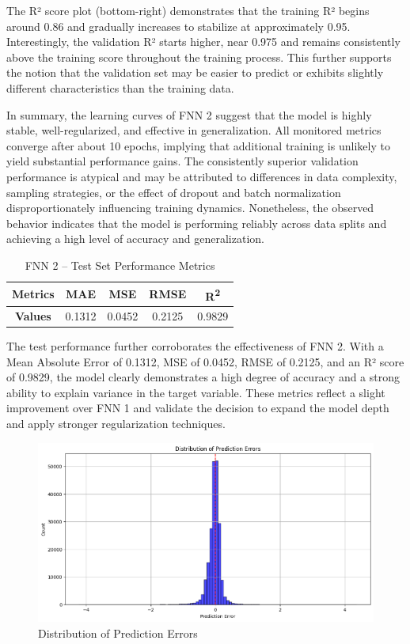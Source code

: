 The R² score plot (bottom-right) demonstrates that the training R² begins around 0.86 and gradually increases to stabilize at approximately 0.95. Interestingly, the validation R² starts higher, near 0.975 and remains consistently above the training score throughout the training process. This further supports the notion that the validation set may be easier to predict or exhibits slightly different characteristics than the training data.

In summary, the learning curves of FNN 2 suggest that the model is highly stable, well-regularized, and effective in generalization. All monitored metrics converge after about 10 epochs, implying that additional training is unlikely to yield substantial performance gains. The consistently superior validation performance is atypical and may be attributed to differences in data complexity, sampling strategies, or the effect of dropout and batch normalization disproportionately influencing training dynamics. Nonetheless, the observed behavior indicates that the model is performing reliably across data splits and achieving a high level of accuracy and generalization.

\begin{table}[h!]
\centering
\caption{FNN 2 – Test Set Performance Metrics}
\begin{tabular}{||c|c|c|c|c||}
\hline
\textbf{Metrics} & MAE & MSE & RMSE & R\textsuperscript{2} \\
\hline \hline
\textbf{Values} & 0.1312 & 0.0452 & 0.2125 & 0.9829 \\
\hline
\end{tabular}
\label{tab:fnn2_test_metrics}
\end{table}

The test performance further corroborates the effectiveness of FNN 2. With a Mean Absolute Error of 0.1312, MSE of 0.0452, RMSE of 0.2125, and an R² score of 0.9829, the model clearly demonstrates a high degree of accuracy and a strong ability to explain variance in the target variable. These metrics reflect a slight improvement over FNN 1 and validate the decision to expand the model depth and apply stronger regularization techniques.

\begin{figure}[!h]
    \centering
    \includegraphics[width=0.8\linewidth]{images/fnn1-de.png}
    \caption{Distribution of Prediction Errors}
    \label{fig:enter-label}
\end{figure}



